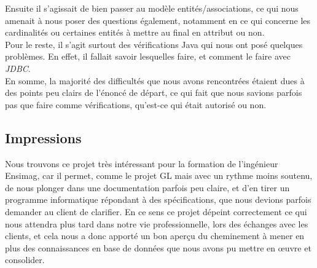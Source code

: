 \documentclass[10pt]{article}
\begin{document}
Ensuite il s'agissait de bien passer au modèle entités/associations, ce qui nous amenait à nous poser des questions également, notamment
en ce qui concerne les cardinalités ou certaines entités à mettre au final en attribut ou non. \\

Pour le reste, il s'agit surtout des vérifications Java qui nous ont posé quelques problèmes. En effet, il fallait savoir lesquelles
faire, et comment le faire avec \emph{JDBC}. \\

En somme, la majorité des difficultés que nous avons rencontrées étaient dues à des points peu clairs de l'énoncé de départ, ce qui fait
que nous savions parfois pas que faire comme vérifications, qu'est-ce qui était autorisé ou non.

\subsection{Impressions}

Nous trouvons ce projet très intéressant pour la formation de l'ingénieur Ensimag, car il permet, comme le projet GL mais avec un
rythme moins soutenu, de nous plonger dans une documentation parfois peu claire, et d'en tirer un programme informatique répondant
à des spécifications, que nous devions parfois demander au client de clarifier. En ce sens ce projet dépeint correctement ce qui nous
attendra plus tard dans notre vie professionnelle, lors des échanges avec les clients, et cela nous a donc apporté un bon aperçu
du cheminement à mener en plus des connaissances en base de données que nous avons pu mettre en \oe{}uvre et consolider.
\end{document}
